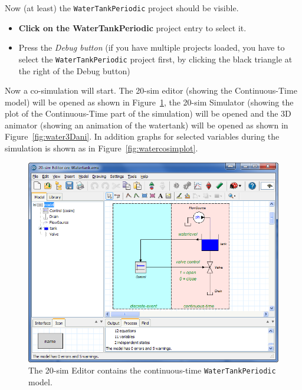 \documentclass{crescendorepchap}
\begin{document}
Now (at least) the \texttt{WaterTankPeriodic} project should be visible.

\begin{itemize}
\item
  \textbf{Click on the WaterTankPeriodic} project entry to select it.
\item
  Press the \emph{Debug button}
  (if you have multiple
  projects loaded, you have to select the \texttt{Water\-Tank\-Periodic} project first, by
  clicking the black triangle at the right of the Debug button)
\end{itemize}

Now a co-simulation will start. The 20-sim editor (showing the
Continuous-Time model) will be opened as shown in
Figure~\ref{fig:watertankeditor}, the 20-sim Simulator (showing the
plot of the Continuous-Time part of the simulation) will be opened and
the 3D animator (showing an animation of the watertank) will be opened
as shown in Figure~\ref{fig:water3Dani}. In addition graphs for
selected variables during the simulation is shown as in
Figure~\ref{fig:watercosimplot}.

\begin{figure}[htbp]
\centering
\includegraphics[width=.9\textwidth]{images/20simEditorWaterTank.png}
\caption{The 20-sim Editor contains the continuous-time \texttt{WaterTankPeriodic} model.\label{fig:watertankeditor}}
\end{figure}
\end{document}
